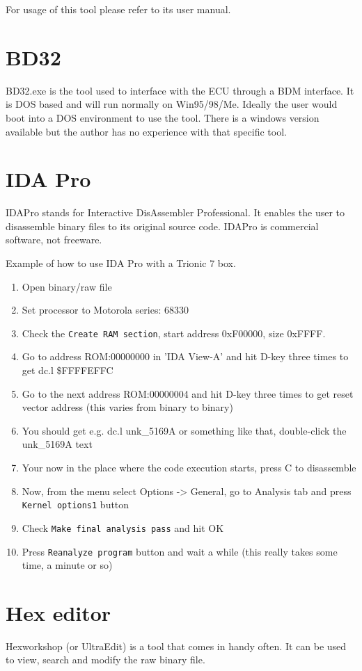 \documentclass[11pt,a4paper]{book}
\begin{document}
For usage of this tool please refer to its user manual.

\section{BD32}
BD32.exe is the tool used to interface with the ECU through a BDM interface. It
is DOS based and will run normally on Win95/98/Me. Ideally the user would boot
into a DOS environment to use the tool. There is a windows version available but
the author has no experience with that specific tool.

\section{IDA Pro}
IDAPro stands for Interactive DisAssembler Professional. It enables the user to
disassemble binary files to its original source code. IDAPro is commercial
software, not freeware.

Example of how to use IDA Pro with a Trionic 7 box.
\begin{enumerate}
    \item Open binary/raw file
    \item Set processor to Motorola series: 68330
    \item Check the \texttt{Create RAM section}, start address 0xF00000, size 0xFFFF.
    \item Go to address ROM:00000000 in 'IDA View-A' and hit D-key three times
        to get dc.l \$FFFFEFFC
    \item Go to the next address ROM:00000004 and hit D-key three times to get reset vector address (this
        varies from binary to binary)
    \item You should get e.g. dc.l unk\_5169A or something like that, double-click
        the unk\_5169A text
    \item Your now in the place where the code execution starts, press C to disassemble
    \item Now, from the menu select Options -> General, go to Analysis tab and press
        \texttt{Kernel options1} button
    \item Check \texttt{Make final analysis pass} and hit OK
    \item Press \texttt{Reanalyze program} button and wait a while (this really takes some time, a minute or so)
\end{enumerate}

\section{Hex editor}
Hexworkshop (or UltraEdit) is a tool that comes in handy often. It can be used to view, search and
modify the raw binary file.
\end{document}
